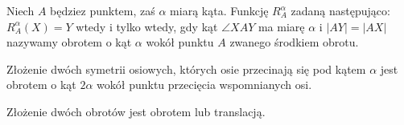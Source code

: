 
\begin{definition}[obrót]
    Niech $A$ będziez punktem, zaś $\alpha$ miarą kąta.
    Funkcję $R_A^\alpha$ zadaną następująco: $R_A^\alpha(X) = Y$ wtedy i tylko wtedy, gdy kąt $\angle XAY$ ma miarę $\alpha$ i $|AY| = |AX|$ nazywamy obrotem o kąt $\alpha$ wokół punktu $A$ zwanego środkiem obrotu.
\end{definition}

\begin{proposition}
    Złożenie dwóch symetrii osiowych, których osie przecinają się pod kątem $\alpha$ jest obrotem o kąt $2 \alpha$ wokół punktu przecięcia wspomnianych osi.
\end{proposition}

\begin{proposition}
\label{for_banach_11}%
    Złożenie dwóch obrotów jest obrotem lub translacją.
\end{proposition}